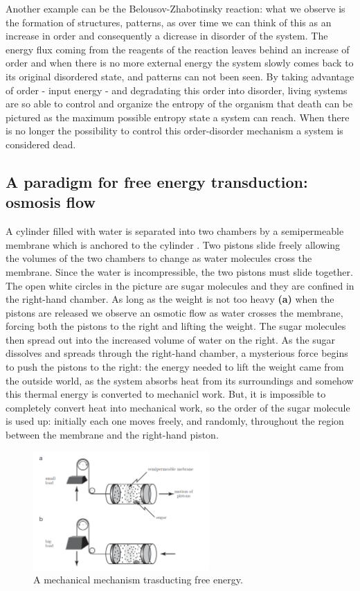 \documentclass[../main/main.tex]{subfiles}
\begin{document}
Another example can be the Belousov-Zhabotinsky reaction: what we observe is the formation of structures, patterns, as over time we can think of this as an increase in order and consequently a dicrease in disorder of the system. The energy flux coming from the reagents of the reaction leaves behind an increase of order and when there is no more external energy the system slowly comes back to its original disordered state, and patterns can not been seen. 
By taking advantage of order - input energy - and degradating this order into disorder, living systems are so able to control and organize the entropy of the organism that death can be pictured as the maximum possible entropy state a system can reach. When there is no longer the possibility to control this order-disorder mechanism a system is considered dead.

\subsection{A paradigm for free energy transduction: osmosis flow}
A cylinder filled with water is separated into two chambers by a semipermeable membrane which is anchored to the cylinder \cite{biological_physics}. Two pistons slide freely allowing the volumes of the two chambers to change as water molecules cross the membrane. Since the water is incompressible, the two pistons must slide together. The open white circles in the picture are sugar molecules and they are confined in the right-hand chamber. 
As long as the weight is not too heavy \textbf{(a)} when the pistons are released we observe an osmotic flow as water crosses the membrane, forcing both the pistons to the right and lifting the weight. The sugar molecules then spread out into the increased volume of water on the right. 
As the sugar dissolves and spreads through the right-hand chamber, a mysterious force begins to push the pistons to the right: the energy needed to lift the weight came from the outside world, as the system absorbs heat from its surroundings and somehow this thermal energy is converted to mechanicl work. But, it is impossible to completely convert heat into mechanical work, so the order of the sugar molecule is used up: initially each one moves freely, and randomly, throughout the region
between the membrane and the right-hand piston. 

\begin{figure}[h!]
    \centering
    \includegraphics[width=0.6\textwidth]{../frontespizio/tikz/1_lesson/osmosis.PNG}
    \caption{A mechanical mechanism trasducting free energy.}
\end{figure}
\end{document}
